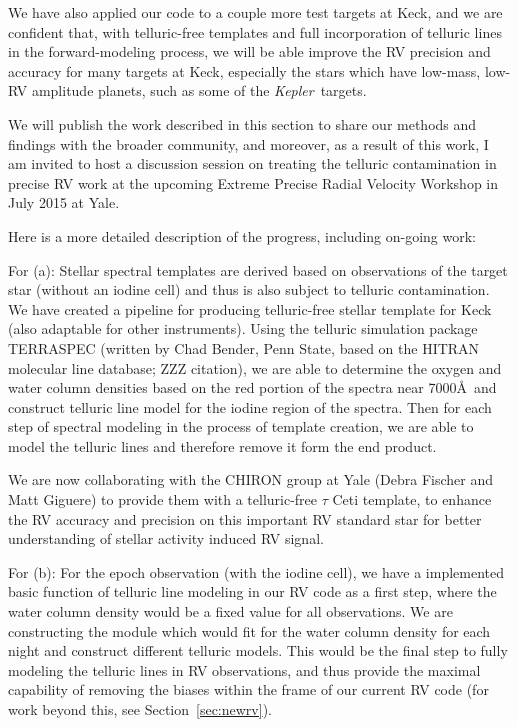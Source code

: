 \documentclass[12pt]{article}
\def\kepler{{\it Kepler}}
\begin{document}
We have also applied our code to a couple more test targets at Keck,
and we are confident that, with telluric-free templates and full
incorporation of telluric lines in the forward-modeling process, we
will be able improve the RV precision and accuracy for many targets at
Keck, especially the stars which have low-mass, low-RV amplitude
planets, such as some of the \kepler\ targets.

We will publish the work described in this section to share our
methods and findings with the broader community, and moreover, as a
result of this work, I am invited to host a discussion session on
treating the telluric contamination in precise RV work at the upcoming
Extreme Precise Radial Velocity Workshop in July 2015 at Yale.

Here is a more detailed description of the progress, including on-going work:

For (a): Stellar spectral templates are derived based on observations
of the target star (without an iodine cell) and thus is also subject
to telluric contamination. We have created a pipeline for producing
telluric-free stellar template for Keck (also adaptable for other
instruments). Using the telluric simulation package TERRASPEC (written
by Chad Bender, Penn State, based on the HITRAN molecular line
database; ZZZ citation), we are able to determine the oxygen and water
column densities based on the red portion of the spectra near
7000\AA\ and construct telluric line model for the iodine region of
the spectra. Then for each step of spectral modeling in the process of
template creation, we are able to model the telluric lines and
therefore remove it form the end product.

We are now collaborating with the CHIRON group at Yale (Debra Fischer
and Matt Giguere) to provide them with a telluric-free $\tau$ Ceti
template, to enhance the RV accuracy and precision on this important
RV standard star for better understanding of stellar activity induced
RV signal.

For (b): For the epoch observation (with the iodine cell), we have
a implemented basic function of telluric line modeling in our RV code as
a first step, where the water column density would be a fixed value
for all observations. We are constructing the module which would fit
for the water column density for each night and construct different
telluric models. This would be the final step to fully modeling the
telluric lines in RV observations, and thus provide the maximal
capability of removing the biases within the frame of our current RV
code (for work beyond this, see Section~\ref{sec:newrv}).
\end{document}
